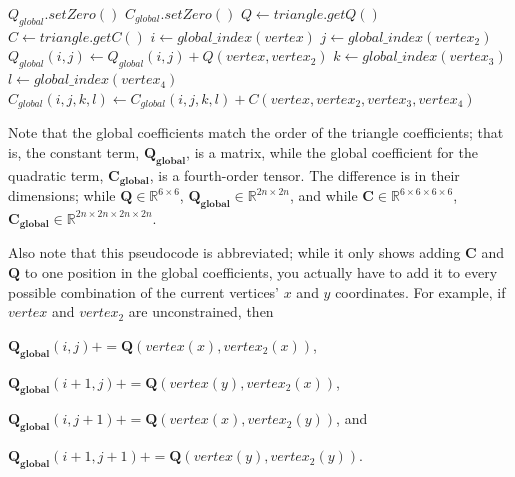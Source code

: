 \documentclass[twocolumn,10pt]{asme2ej}
\begin{document}
\bigskip
\begin{algorithmic}[1]
        \State $Q_{global}.setZero()$
        \State $C_{global}.setZero()$
         \State $Q \gets triangle.getQ()$
         \State $C \gets triangle.getC()$
                  \State $i \gets global\_index(vertex)$
                          \State $j \gets global\_index(vertex_2)$
                          \State $Q_{global}(i,j) \gets Q_{global}(i,j) + Q(vertex, vertex_2)$
                                \State $k \gets global\_index(vertex_3)$
                                    \State $l \gets global\_index(vertex_4)$
                                    \State $C_{global}(i,j,k,l)  \gets C_{global}(i,j,k,l)+C(vertex, vertex_2, vertex_3, vertex_4)$
                                  \EndFor
                            \EndFor
                      \EndIf
                    \EndFor
              \EndIf
            \EndFor
        \EndFor
    \EndFunction
\end{algorithmic}

Note that the global coefficients match the order of the triangle coefficients; that is, the constant term, $\bm{Q_{global}}$, is a matrix, while the global coefficient for the quadratic term, $\bm{C_{global}}$, is a fourth-order tensor. The difference is in their dimensions; while $\bm{Q} \in \mathbb{R}^{6 \times 6}$, $\bm{Q_{global}} \in \mathbb{R}^{2n \times 2n}$, and while  $\bm{C} \in \mathbb{R}^{6 \times 6 \times 6 \times 6}$, $\bm{C_{global}} \in \mathbb{R}^{2n \times 2n \times 2n \times 2n}$.

Also note that this pseudocode is abbreviated; while it only shows adding $\bm{C}$ and $\bm{Q}$ to one position in the global coefficients, you actually have to add it to every possible combination of the current vertices' $x$ and $y$ coordinates. For example, if $vertex$ and $vertex_2$ are unconstrained, then

\begin{center}
$\bm{Q_{global}}(i,j) += \bm{Q}(vertex(x), vertex_2(x))$,

$\bm{Q_{global}}(i + 1,j) += \bm{Q}(vertex(y), vertex_2(x))$,

$\bm{Q_{global}}(i ,j + 1) += \bm{Q}(vertex(x), vertex_2(y))$, and

$\bm{Q_{global}}(i + 1,j + 1) += \bm{Q}(vertex(y), vertex_2(y))$.
\end{center}
\end{document}
